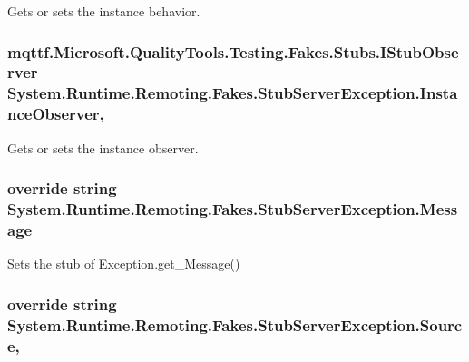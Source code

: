 Gets or sets the instance behavior.

\hypertarget{class_system_1_1_runtime_1_1_remoting_1_1_fakes_1_1_stub_server_exception_a2944ccaae6c48163d76b8da11168f30d}{
\subsubsection[{Instance\-Observer}]{\setlength{\rightskip}{0pt plus 5cm}mqttf.\-Microsoft.\-Quality\-Tools.\-Testing.\-Fakes.\-Stubs.\-I\-Stub\-Observer System.\-Runtime.\-Remoting.\-Fakes.\-Stub\-Server\-Exception.\-Instance\-Observer\hspace{0.3cm}{\ttfamily [get]}, {\ttfamily [set]}}}\label{class_system_1_1_runtime_1_1_remoting_1_1_fakes_1_1_stub_server_exception_a2944ccaae6c48163d76b8da11168f30d}


Gets or sets the instance observer.

\hypertarget{class_system_1_1_runtime_1_1_remoting_1_1_fakes_1_1_stub_server_exception_a1535cd58ad810b48d3b21e6630c278fa}{
\subsubsection[{Message}]{\setlength{\rightskip}{0pt plus 5cm}override string System.\-Runtime.\-Remoting.\-Fakes.\-Stub\-Server\-Exception.\-Message\hspace{0.3cm}{\ttfamily [get]}}}\label{class_system_1_1_runtime_1_1_remoting_1_1_fakes_1_1_stub_server_exception_a1535cd58ad810b48d3b21e6630c278fa}


Sets the stub of Exception.\-get\-\_\-\-Message()

\hypertarget{class_system_1_1_runtime_1_1_remoting_1_1_fakes_1_1_stub_server_exception_aaf07a00514aba6020948a3b00747ad44}{
\subsubsection[{Source}]{\setlength{\rightskip}{0pt plus 5cm}override string System.\-Runtime.\-Remoting.\-Fakes.\-Stub\-Server\-Exception.\-Source\hspace{0.3cm}{\ttfamily [get]}, {\ttfamily [set]}}}\label{class_system_1_1_runtime_1_1_remoting_1_1_fakes_1_1_stub_server_exception_aaf07a00514aba6020948a3b00747ad44}


